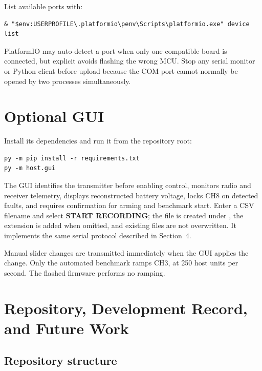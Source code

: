 \documentclass[11pt,a4paper]{article}
\newcommand{\file}[1]{\texttt{\detokenize{#1}}}
\newcommand{\code}[1]{\texttt{\detokenize{#1}}}
\begin{document}
List available ports with:

\begin{lstlisting}
& "$env:USERPROFILE\.platformio\penv\Scripts\platformio.exe" device list
\end{lstlisting}

PlatformIO may auto-detect a port when only one compatible board is connected,
but explicit \code{--upload-port} avoids flashing the wrong MCU. Stop any serial
monitor or Python client before upload because the COM port cannot normally be
opened by two processes simultaneously.

\section{Optional GUI}

Install its dependencies and run it from the repository root:

\begin{lstlisting}
py -m pip install -r requirements.txt
py -m host.gui
\end{lstlisting}

The GUI identifies the transmitter before enabling control, monitors radio and
receiver telemetry, displays reconstructed battery voltage, locks CH8 on
detected faults, and requires confirmation for arming and benchmark start.
Enter a CSV filename and select
\textbf{START RECORDING}; the file is created under \file{logs/}, the
\file{.csv} extension is added when omitted, and existing files are not
overwritten. It implements the same serial protocol described in Section~4.

Manual slider changes are transmitted immediately when the GUI applies the
change. Only the automated benchmark ramps CH3, at 250 host units per second.
The flashed \file{.ino} firmware performs no ramping.

\section{Repository, Development Record, and Future Work}

\subsection{Repository structure}
\end{document}
